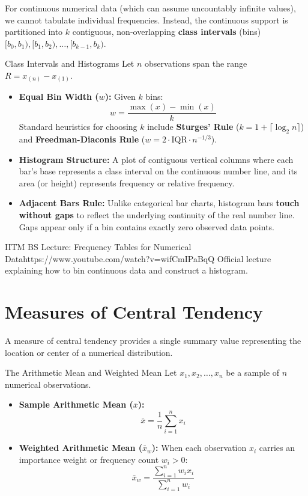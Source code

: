 For continuous numerical data (which can assume uncountably infinite values), we cannot tabulate individual frequencies. Instead, the continuous support is partitioned into $k$ contiguous, non-overlapping \textbf{class intervals} (bins) $[b_0, b_1), [b_1, b_2), \dots, [b_{k-1}, b_k)$.

\begin{definitionbox}{Class Intervals and Histograms}
Let $n$ observations span the range $R = x_{(n)} - x_{(1)}$.
\begin{itemize}
    \item \textbf{Equal Bin Width ($w$):} Given $k$ bins:
    $$w = \frac{\max(x) - \min(x)}{k}$$
    Standard heuristics for choosing $k$ include \textbf{Sturges' Rule} ($k = 1 + \lceil \log_2 n \rceil$) and \textbf{Freedman-Diaconis Rule} ($w = 2 \cdot \text{IQR} \cdot n^{-1/3}$).
    \item \textbf{Histogram Structure:} A plot of contiguous vertical columns where each bar's base represents a class interval on the continuous number line, and its area (or height) represents frequency or relative frequency.
    \item \textbf{Adjacent Bars Rule:} Unlike categorical bar charts, histogram bars \textbf{touch without gaps} to reflect the underlying continuity of the real number line. Gaps appear only if a bin contains exactly zero observed data points.
\end{itemize}
\end{definitionbox}

\begin{videocard}{IITM BS Lecture: Frequency Tables for Numerical Data}{https://www.youtube.com/watch?v=wifCmIPaBqQ}
Official lecture explaining how to bin continuous data and construct a histogram.
\end{videocard}

\section{Measures of Central Tendency}

A measure of central tendency provides a single summary value representing the location or center of a numerical distribution.

\begin{definitionbox}{The Arithmetic Mean and Weighted Mean}
Let $x_1, x_2, \dots, x_n$ be a sample of $n$ numerical observations.
\begin{itemize}
    \item \textbf{Sample Arithmetic Mean ($\bar{x}$):}
    $$\bar{x} = \frac{1}{n}\sum_{i=1}^n x_i$$
    \item \textbf{Weighted Arithmetic Mean ($\bar{x}_w$):} When each observation $x_i$ carries an importance weight or frequency count $w_i > 0$:
    $$\bar{x}_w = \frac{\sum_{i=1}^n w_i x_i}{\sum_{i=1}^n w_i}$$
\end{itemize}
\end{definitionbox}

